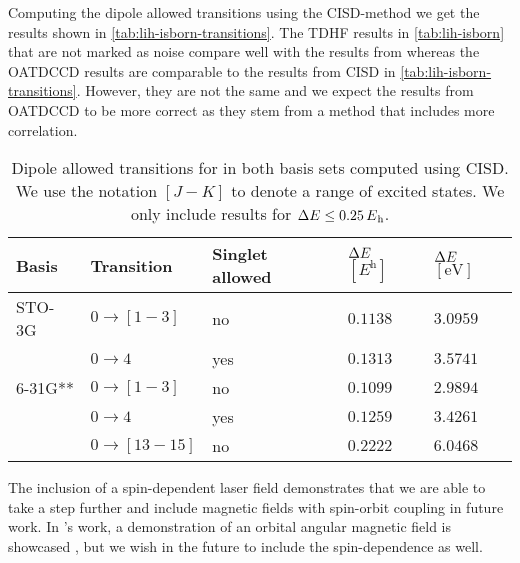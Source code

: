         Computing the dipole allowed transitions using the CISD-method we get
        the results shown in \autoref{tab:lih-isborn-transitions}.
        The TDHF results in \autoref{tab:lih-isborn} that are not marked as
        noise compare well with the results from \citeauthor{isborn}
        \cite{isborn} whereas the OATDCCD results are comparable to the results
        from CISD in \autoref{tab:lih-isborn-transitions}.
        However, they are not the same and we expect the results from OATDCCD to
        be more correct as they stem from a method that includes more
        correlation.
        \begin{table}
            \centering
            \caption{Dipole allowed transitions for  in both basis sets
            computed using CISD.
            We use the notation $[J - K]$ to denote a range of excited states.
            We only include results for $\Delta \energy \leq
            \SI{0.25}{\hartree}$.}
            \begin{tabular}{@{}lllll@{}}
                \toprule
                Basis & Transition & Singlet allowed
                & $\Delta E$ $[\si{\hartree}]$
                & $\Delta E$ $[\si{\electronvolt}]$ \\
                \midrule
                STO-3G & $0 \to [1-3]$ & no & $0.1138$ & $3.0959$ \\
                & $0 \to 4$ & yes & $0.1313$ & $3.5741$ \\
                6-31G** & $0 \to [1-3]$ & no & $0.1099$ & $2.9894$ \\
                & $0 \to 4$ & yes & $0.1259$ & $3.4261$ \\
                & $0 \to [13-15]$ & no & $0.2222$ & $6.0468$ \\
                \bottomrule
            \end{tabular}
            \label{tab:lih-isborn-transitions}
        \end{table}

        The inclusion of a spin-dependent laser field demonstrates that we are
        able to take a step further and include magnetic fields with spin-orbit
        coupling in future work.
        In \citeauthor{greg-winther}'s work, a demonstration of an orbital
        angular magnetic field is showcased \cite{greg-winther}, but we wish in the future to
        include the spin-dependence as well.


